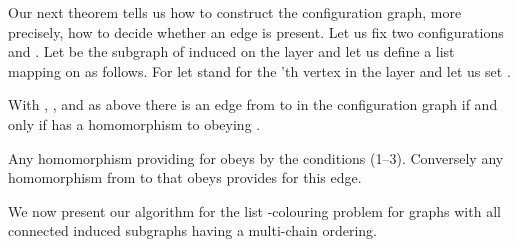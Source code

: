 \documentclass[12pt]{llncs}
\begin{document}
Our next theorem tells us how to construct the configuration graph,
more precisely, how to decide whether an edge is present. Let us fix
two configurations  and . Let  be
the subgraph of  induced on the layer  and let us define a
list mapping  on  as follows. For 
let  stand for the 'th vertex in the layer  and let us
set .

\begin{theorem}\label{const}
With , ,  and  as above there is an edge from
 to  in the configuration graph if and only if  has a homomorphism
to  obeying .
\end{theorem}

\begin{my_proof}
Any homomorphism providing for  obeys  by
the conditions (1--3). Conversely any homomorphism from  to  that
obeys  provides for this edge.
\end{my_proof}

We now present our algorithm for the list -colouring problem for graphs with
all connected induced subgraphs having a multi-chain ordering. 
\end{document}
